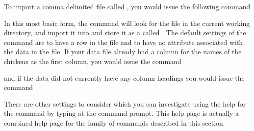 To import a comma delimited file called , you would issue the following command 
\begin{knitrout}
\color{fgcolor}\begin{kframe}
\begin{alltt}
\hlstd{> } \hlkwb{=} \hlstd{(}\hlstd{)}
\end{alltt}
\end{kframe}
\end{knitrout}
In this most basic form, the  
 command will look for the  file in the current working directory, and import it into \R{} and store it as a  called . The default settings of the  command are to have a  row in the file and to have no  attribute associated with the data in the file. If your data file already had a column for the names of the chickens as the first column, you would issue the command 
\begin{knitrout}
\color{fgcolor}\begin{kframe}
\begin{alltt}
\hlstd{> } \hlkwb{=} \hlstd{(}\hlstd{,} \hlstd{=}\hlstd{)}
\end{alltt}
\end{kframe}
\end{knitrout}
and if the data did not currently have any column headings you would issue the command 
\begin{knitrout}
\color{fgcolor}\begin{kframe}
\begin{alltt}
\hlstd{> } \hlkwb{=} \hlstd{(}\hlstd{,} \hlstd{=}\hlstd{)}
\end{alltt}
\end{kframe}
\end{knitrout}
 
There are other settings to consider which you can investigate using the help for the  command by typing  at the command prompt. This help page is actually a combined help page for the family of commands described in this section. 
 

